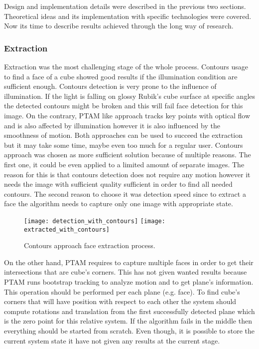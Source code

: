 \documentclass[../../main.tex]{subfiles}
\begin{document}
Design and implementation details were described in the previous two sections. Theoretical ideas and its implementation with specific technologies were covered. Now its time to describe results achieved through the long way of research.

\subsubsection*{Extraction}

Extraction was the most challenging stage of the whole process. Contours usage to find a face of a cube showed good results if the illumination condition are sufficient enough. Contours detection is very prone to the influence of illumination. If the light is falling on glossy Rubik's cube surface at specific angles the detected contours might be broken and this will fail face detection for this image. On the contrary, \ac{PTAM} like approach tracks key points with optical flow and is also affected by illumination however it is also influenced by the smoothness of motion. Both approaches can be used to succeed the extraction but it may take some time, maybe even too much for a regular user. Contours approach was chosen as more sufficient solution because of multiple reasons. The first one, it could be even applied to a limited amount of separate images. The reason for this is that contours detection does not require any motion however it needs the image with sufficient quality sufficient in order to find all needed contours. The second reason to choose it was detection speed since to extract a face the algorithm needs to capture only one image with appropriate state. 

\begin{figure} [ht!]
    \begin{center}
        \texttt{[image: detection\_with\_contours]}
        \texttt{[image: extracted\_with\_contours]}
        \caption{Contours approach face extraction process.}
        \label{fig:contours_approach_face_detection}
    \end{center}
\end{figure}

On the other hand, \ac{PTAM} requires to capture multiple faces in order to get their intersections that are cube's corners. This has not given wanted results because \ac{PTAM} runs bootstrap tracking to analyze motion and to get plane's information. This operation should be performed per each plane (e.g. face). To find cube's corners that will have position with respect to each other the system should compute rotations and translation from the first successfully detected plane which is the zero point for this relative system. If the algorithm fails in the middle then everything should be started from scratch. Even though, it is possible to store the current system state it have not given any results at the current stage.
\end{document}
